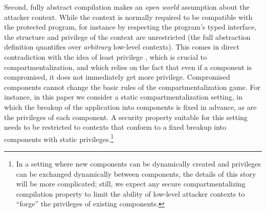 \documentclass[10pt, conference, compsocconf, letterpaper, times]{IEEEtran}
\begin{document}
Second, fully abstract compilation makes an {\em open world} assumption
about the attacker context. While the context is normally required to
be compatible with the protected program, for instance by respecting
the program's typed interface, the structure and privilege of the context are
unrestricted (the full abstraction definition quantifies over {\em
  arbitrary} low-level contexts).
This comes in direct contradiction with the idea of least
privilege\ifsooner
{}\fi,
which is crucial to compartmentalization, and which relies on the fact
that even if a component is compromised, it does not immediately get
more privilege.
Compromised components cannot change the basic rules of the
compartmentalization game.
For instance, in this paper we consider a static compartmentalization
setting, in which the breakup of the application into components is
fixed in advance, as are the privileges of each component.
A security property suitable for this setting needs to be restricted
to contexts that conform to a fixed breakup into components with
static privileges.\footnote{In a setting where new components can be dynamically created and
  privileges can be exchanged dynamically between components, the
  details of this story will be more complicated; still, we expect any
  secure compartmentalizing compilation property to limit the ability
  of low-level attacker contexts to ``forge'' the privileges of
  existing components.}


\iffull
{}
\fi
\end{document}
